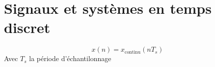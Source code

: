 \documentclass[resume]{subfiles}
\begin{document}
\section{Signaux et systèmes en temps discret}
$$x(n)=x_\text{continu}(nT_s)$$
Avec $T_s$ la période d'échantilonnage
\end{document}
